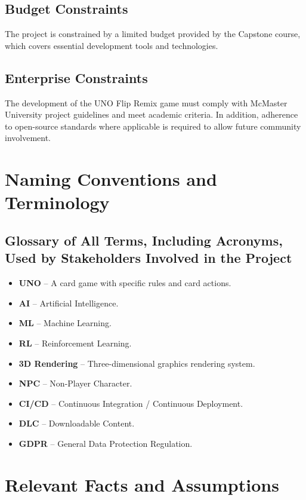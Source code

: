 \documentclass{article}
\begin{document}
\subsection{Budget Constraints}
The project is constrained by a limited budget provided by the Capstone course, which covers essential development tools and technologies.

\subsection{Enterprise Constraints}
The development of the UNO Flip Remix game must comply with McMaster University project guidelines and meet academic criteria. In addition, adherence to open-source standards where applicable is required to allow future community involvement.

\section{Naming Conventions and Terminology}

\subsection{Glossary of All Terms, Including Acronyms, Used by Stakeholders Involved in the Project}

\begin{itemize}
    \item \textbf{UNO} – A card game with specific rules and card actions.
    \item \textbf{AI} – Artificial Intelligence.
    \item \textbf{ML} – Machine Learning.
    \item \textbf{RL} – Reinforcement Learning.
    \item \textbf{3D Rendering} – Three-dimensional graphics rendering system.
    \item \textbf{NPC} – Non-Player Character.
    \item \textbf{CI/CD} – Continuous Integration / Continuous Deployment.
    \item \textbf{DLC} – Downloadable Content.
    \item \textbf{GDPR} – General Data Protection Regulation.
\end{itemize}

\section{Relevant Facts and Assumptions}
\end{document}

